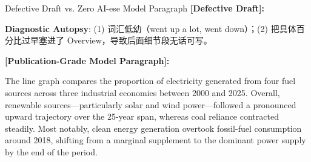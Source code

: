\begin{ExampleBox}{Defective Draft vs. Zero AI-ese Model Paragraph}
\textbf{\color{TargetHighlight}[Defective Draft]:}\par
{}\par\vspace{4pt}
\textbf{Diagnostic Autopsy}: (1)  词汇低幼（went up a lot, went down）；(2)  把具体百分比过早塞进了 Overview，导致后面细节段无话可写。\par\vspace{6pt}
\textbf{\color{AcadNavy}[Publication-Grade Model Paragraph]:}\par
The line graph compares the proportion of electricity generated from four fuel sources across three industrial economies between 2000 and 2025. Overall, renewable sources---particularly solar and wind power---followed a pronounced upward trajectory over the 25-year span, whereas coal reliance contracted steadily. Most notably, clean energy generation overtook fossil-fuel consumption around 2018, shifting from a marginal supplement to the dominant power supply by the end of the period.
\end{ExampleBox}
